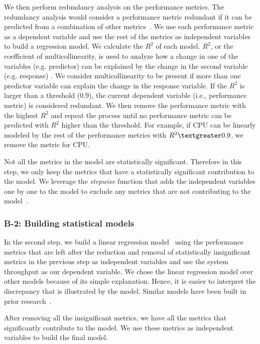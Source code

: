 \documentclass[smallextended]{svjour3}       %
\begin{document}
We then perform redundancy analysis on the performance metrics. The redundancy analysis would consider a performance metric redundant if it can be predicted from a combination of other metrics~\cite{harrell2001regression}. We use each performance metric as a dependent variable and use the rest of the metrics as independent variables to build a regression model. We calculate the $R^2$ of each model. $R^2$, or the coefficient of multicollinearity, is used to analyze how a change in one of the variables (e.g. predictor) can be explained by the change in the second variable (e.g. response) \cite{rsquare}. We consider multicollinearity to be present if more than one predictor variable can explain the change in the response variable. If the $R^2$ is larger than a threshold (0.9)\cite{Syer2016}, the current dependent variable (i.e., performance metric) is considered redundant. We then remove the performance metric with the highest $R^2$ and repeat the process until no performance metric can be predicted with $R^2$ higher than the threshold. For example, if CPU can be linearly modeled by the rest of the performance metrics with $R^2\textgreater0.9$, we remove the metric for CPU.

Not all the metrics in the model are statistically significant. Therefore in this step, we only keep the metrics that have a statistically significant contribution to the model. We leverage the \textit{stepwise} function that adds the independent variables one by one to the model to exclude any metrics that are not contributing to the model~\cite{RInAction}. 

\subsubsection{B-2: Building statistical models}

In the second step, we build a linear regression model~\cite{freedman2009statistical} using the performance metrics that are left after the reduction and removal of statistically insignificant metrics in the previous step as independent variables and use the system throughput as our dependent variable. We chose the linear regression model over other models because of its simple explanation. Hence, it is easier to interpret the discrepancy that is illustrated by the model. Similar models have been built in prior research~\cite{Cohen:2005:CIC:1095810.1095821,xiong2013vperfguard,Shang:2015:ADP:2668930.2688052}.

After removing all the insignificant metrics, we have all the metrics that significantly contribute to the model. We use these metrics as independent variables to build the final model.
\end{document}
